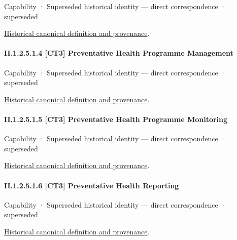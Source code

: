 \label{element:b35d3521141c419fb676a79b2ede40bd}
{\small Capability · Superseded historical identity — direct correspondence · superseded}\par
\href{../../../../continuum/strategy/capability/b35d3521141c419fb676a79b2ede40bd.md}{Historical canonical definition and provenance}.\par
\paragraph*{II.1.2.5.1.4 [CT3] Preventative Health Programme Management}
\label{navigation:II.1.2.5.1.4}

\label{element:d71def9e76a544ff9761c672bb24f3be}
{\small Capability · Superseded historical identity — direct correspondence · superseded}\par
\href{../../../../continuum/strategy/capability/d71def9e76a544ff9761c672bb24f3be.md}{Historical canonical definition and provenance}.\par
\paragraph*{II.1.2.5.1.5 [CT3] Preventative Health Programme Monitoring}
\label{navigation:II.1.2.5.1.5}

\label{element:e05f6310f6d544efaca5568604f27dd8}
{\small Capability · Superseded historical identity — direct correspondence · superseded}\par
\href{../../../../continuum/strategy/capability/e05f6310f6d544efaca5568604f27dd8.md}{Historical canonical definition and provenance}.\par
\paragraph*{II.1.2.5.1.6 [CT3] Preventative Health Reporting}
\label{navigation:II.1.2.5.1.6}

\label{element:4faef45b4ebe4fa69e57c3d81bfea05f}
{\small Capability · Superseded historical identity — direct correspondence · superseded}\par
\href{../../../../continuum/strategy/capability/4faef45b4ebe4fa69e57c3d81bfea05f.md}{Historical canonical definition and provenance}.\par
